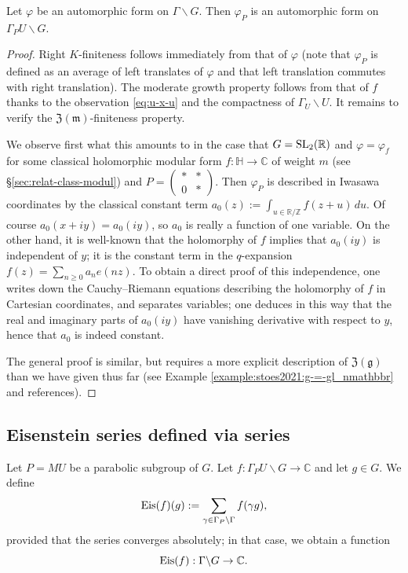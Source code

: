 \documentclass[reqno]{amsart} 
\begin{document}
\begin{lemma}
  Let $\varphi$ be an automorphic form on $\Gamma \backslash G$.  Then $\varphi_P$ is an automorphic form on $\Gamma_P U \backslash G$.
\end{lemma}
\begin{proof}
  Right $K$-finiteness follows immediately from that of $\varphi$ (note that $\varphi_P$ is defined as an average of left translates of $\varphi$ and that left translation commutes with right translation).  The moderate growth property follows from that of $f$ thanks to the observation \eqref{eq:u-x-u} and the compactness of $\Gamma_U \backslash U$.  It remains to verify the $\mathfrak{Z}(\mathfrak{m})$-finiteness property.

  We observe first what this amounts to in the case that $G = \operatorname{SL}_2(\mathbb{R})$ and $\varphi = \varphi_f$ for some classical holomorphic modular form $f : \mathbb{H} \rightarrow \mathbb{C}$ of weight $m$ (see \S\ref{sec:relat-class-modul}) and $P = 
  \begin{pmatrix}
    \ast & \ast \\
    0 & \ast
  \end{pmatrix}
  $.  Then $\varphi_P$ is described in Iwasawa coordinates by the classical constant term $a_0(z) := \int _{u \in \mathbb{R}/\mathbb{Z} } f(z+u) \,d u$.  Of course $a_0(x + i y) = a_0(i y)$, so $a_0$ is really a function of one variable.  On the other hand, it is well-known that the holomorphy of $f$ implies that $a_0(i y)$ is independent of $y$; it is the constant term in the $q$-expansion $f(z) = \sum_{n \geq 0} a_n e(n z)$.  To obtain a direct proof of this independence, one writes down the Cauchy--Riemann equations describing the holomorphy of $f$ in Cartesian coordinates, and separates variables; one deduces in this way that the real and imaginary parts of $a_0(i y)$ have vanishing derivative with respect to $y$, hence that $a_0$ is indeed constant.

  The general proof is similar, but requires a more explicit description of $\mathfrak{Z}(\mathfrak{g})$ than we have given thus far (see Example \ref{example:stoes2021:g-=-gl_nmathbbr} and references).
\end{proof}

\subsection{Eisenstein series defined via series}
\begin{definition}
  Let $P = M U$ be a parabolic subgroup of $G$.  Let $f : \Gamma_P U \backslash G \rightarrow \mathbb{C}$ and let $g \in G$.  We define
  \begin{equation}\label{eq:eisfg-:=-sum}
    \operatorname{Eis}(f)(g) := \sum _{\gamma \in \Gamma_P \backslash \Gamma } f(\gamma g),
  \end{equation}
  provided that the series converges absolutely; in that case, we obtain a function
  \begin{equation*}
    \operatorname{Eis}(f) : \Gamma \backslash G \rightarrow \mathbb{C}.
  \end{equation*}
\end{definition}
\end{document}
